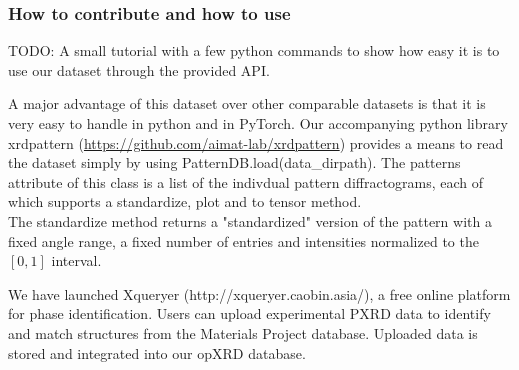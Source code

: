 \subsubsection*{How to contribute and how to use}

TODO: A small tutorial with a few python commands to show how easy it is to use our dataset through the provided API.

A major advantage of this dataset over other comparable datasets is that it is very easy to handle in python and in PyTorch.
Our accompanying python library xrdpattern (\url{https://github.com/aimat-lab/xrdpattern}) provides a means to read the dataset simply by using PatternDB.load(data\_dirpath). The patterns attribute of this class is a list of the indivdual pattern diffractograms, each of which supports a standardize, plot and to tensor method. \\
The standardize method returns a "standardized" version of the pattern with a fixed angle range, a fixed number of entries and intensities normalized to the $[0,1]$ interval.

We have launched Xqueryer (http://xqueryer.caobin.asia/), a free online platform for phase identification. Users can upload experimental PXRD data to identify and match structures from the Materials Project database. Uploaded data is stored and integrated into our opXRD database.